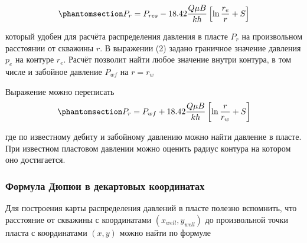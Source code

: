 \documentclass[
  russian,
  letterpaper,
  DIV=11,
  numbers=noendperiod,
  oneside]{scrartcl}
\begin{document}
\begin{equation}\phantomsection\label{eq-dupui_3}{
    P_{r} = P_{res} - 18.42\dfrac{ Q\mu B }{kh} \left[ \ln\dfrac{r_e}{r} +S \right]
}\end{equation}

который удобен для расчёта распределения давления в пласте \(P_r\) на
произвольном расстоянии от скважины \(r\). В выражении (2) задано
граничное значение давления \(p_e\) на контуре \(r_e\). Расчёт позволит
найти любое значение внутри контура, в том числе и забойное давление
\(P_{wf}\) на \(r=r_w\)

Выражение можно переписать
\begin{equation}\phantomsection\label{eq-dupui_4}{
    P_{r} = P_{wf} + 18.42\dfrac{ Q\mu B }{kh} \left[ \ln\dfrac{r}{r_w} +S \right]
}\end{equation}

где по известному дебиту и забойному давлению можно найти давление в
пласте. При известном пластовом давлении можно оценить радиус контура на
котором оно достигается.

\subsubsection{Формула Дюпюи в декартовых
координатах}\label{ux444ux43eux440ux43cux443ux43bux430-ux434ux44eux43fux44eux438-ux432-ux434ux435ux43aux430ux440ux442ux43eux432ux44bux445-ux43aux43eux43eux440ux434ux438ux43dux430ux442ux430ux445}

Для построения карты распределения давлений в пласте полезно вспомнить,
что расстояние от скважины с координатами \((x_{well}, y_{well})\) до
произвольной точки пласта с координатами \((x,y)\) можно найти по
формуле
\end{document}
